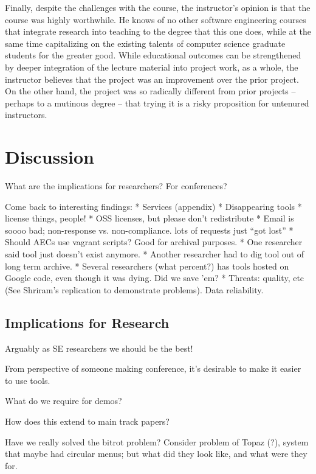 \documentclass[10pt,conference]{IEEEtran}
\begin{document}
Finally, despite the challenges with the course, the instructor's opinion is that 
the course was highly worthwhile.
He knows of no other software engineering courses that integrate research into 
teaching to the degree that this one does, while at the same time capitalizing
on the existing talents of computer science graduate students for the greater 
good.
While educational outcomes can be strengthened by deeper integration of the lecture
material into project work, as a whole, the instructor believes that 
the project was an improvement over the prior project.
On the other hand, the project was so radically different from prior 
projects -- perhaps to a mutinous degree -- that trying it is a risky 
proposition for untenured instructors.

\section{Discussion}

What are the implications for researchers? For conferences?

Come back to interesting findings:
* Services (appendix)
* Disappearing tools
* license things, people!
* OSS licenses, but please don't redistribute
* Email is soooo bad; non-response vs. non-compliance. lots of requests just ``got lost''
* Should AECs use vagrant scripts? Good for archival purposes.
* One researcher said tool just doesn't exist anymore.
* Another researcher had to dig tool out of long term archive.
* Several researchers (what percent?) has tools hosted on Google code, even though it was dying. Did we save 'em?
* Threats: quality, etc (See Shriram's replication to demonstrate problems). Data reliability.

\subsection{Implications for Research}

Arguably as SE researchers we should be the best!

From perspective of someone making conference, it's 
desirable to make it easier to use tools.

What do we require for demos?

How does this extend to main track papers?

Have we really solved the bitrot problem?
Consider problem of Topaz (?), system that
maybe had circular menus; but what did they
look like, and what were they for.
\end{document}
